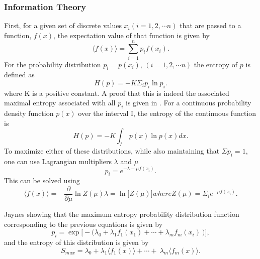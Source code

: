 \subsubsection*{Information Theory}

First, for a given set of discrete values $x_i (i=1,2, \cdots n)$
that are passed to a function, $f(x)$, the expectation value of that function is given
by
\begin{equation}
  \big\langle f(x) \big\rangle = \sum_{i=1}^n p_if(x_i).
\end{equation}
For the probability distribution $p_i = p(x_i)$, $(i=1,2, \cdots n)$ the entropy of
$p$ is defined as
\begin{equation}
  H(p) = - K \Sigma_i p_i \ln p_i .
  \label{eq:entropy}
\end{equation}
where K is a positive constant. A proof that this is indeed the associated
maximal entropy associated with all $p_i$ is given in
\cite{jaynes_information_1957}.
For a continuous probability density function $p(x)$ over the interval I, the
entropy of the continuous function is
\begin{equation}
  H(p) = - K \int_I\ p(x) \ln p(x) dx .
\end{equation}
To maximize either of these distributions, while also maintaining that $\Sigma
p_i = 1$, one can use Lagrangian multipliers $\lambda$ and $\mu$
\begin{equation}
  p_i = e^{-\lambda-\mu f(x_i)} .
\end{equation}
This can be solved using
\begin{subequations}
  \begin{equation}
    \big\langle f(x) \big\rangle = - \frac{\partial}{\partial \mu} \ln Z(\mu)
  \end{equation}
  \begin{equation}
    \lambda = \ln\big[Z(\mu)\big]
  \end{equation}
  where
  \begin{equation}
    Z(\mu) = \Sigma_i e^{-\mu f(x_i)} .
  \end{equation}
\end{subequations}

Jaynes \cite{jaynes_information_1957} showing that the maximum
entropy probability distribution function corresponding to the previous
equations is given by
\begin{equation}
  p_i= \exp \big[ - \big( \lambda_0 + \lambda_1f_1(x_1) + \cdots + \lambda_m f_m(x_i) \
    \big) \big] ,
\end{equation}
and the entropy of this distribution is given by
\begin{equation}
  S_{max} = \lambda_0 + \lambda_1 \big\langle f_1 (x) \big\rangle + \cdots + \
  \lambda_m \big\langle f_m(x) \big\rangle .
\end{equation}

